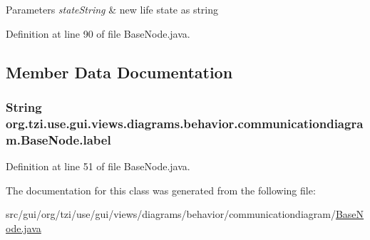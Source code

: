 \begin{DoxyParams}{Parameters}
{\em state\-String} & new life state as string \\
\hline
\end{DoxyParams}


Definition at line 90 of file Base\-Node.\-java.



\subsection{Member Data Documentation}
\hypertarget{classorg_1_1tzi_1_1use_1_1gui_1_1views_1_1diagrams_1_1behavior_1_1communicationdiagram_1_1_base_node_a78896c3b4390b7ec9984683676148eb1}{
\subsubsection[{label}]{\setlength{\rightskip}{0pt plus 5cm}String org.\-tzi.\-use.\-gui.\-views.\-diagrams.\-behavior.\-communicationdiagram.\-Base\-Node.\-label\hspace{0.3cm}{\ttfamily [protected]}}}\label{classorg_1_1tzi_1_1use_1_1gui_1_1views_1_1diagrams_1_1behavior_1_1communicationdiagram_1_1_base_node_a78896c3b4390b7ec9984683676148eb1}


Definition at line 51 of file Base\-Node.\-java.



The documentation for this class was generated from the following file\-:\begin{DoxyCompactItemize}
\item 
src/gui/org/tzi/use/gui/views/diagrams/behavior/communicationdiagram/\hyperlink{_base_node_8java}{Base\-Node.\-java}\end{DoxyCompactItemize}
